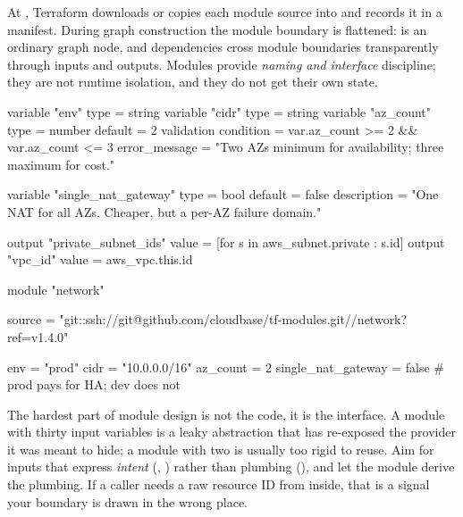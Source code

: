  At , Terraform downloads or copies each module source into  and records it in a manifest. During graph construction the module boundary is flattened:  is an ordinary graph node, and dependencies cross module boundaries transparently through inputs and outputs. Modules provide \emph{naming and interface} discipline; they are not runtime isolation, and they do not get their own state.

\begin{tfbox}
variable "env"      { type = string }
variable "cidr"     { type = string }
variable "az_count" {
  type    = number
  default = 2
  validation {
    condition     = var.az_count >= 2 && var.az_count <= 3
    error_message = "Two AZs minimum for availability; three maximum for cost."
  }
}

variable "single_nat_gateway" {
  type        = bool
  default     = false
  description = "One NAT for all AZs. Cheaper, but a per-AZ failure domain."
}

output "private_subnet_ids" { value = [for s in aws_subnet.private : s.id] }
output "vpc_id"             { value = aws_vpc.this.id }
\end{tfbox}

\begin{tfbox}
module "network" {
  source = "git::ssh://git@github.com/cloudbase/tf-modules.git//network?ref=v1.4.0"

  env                = "prod"
  cidr               = "10.0.0.0/16"
  az_count           = 2
  single_nat_gateway = false   # prod pays for HA; dev does not
}
\end{tfbox}

\begin{seniornote}
The hardest part of module design is not the code, it is the interface. A module with thirty input variables is a leaky abstraction that has re-exposed the provider it was meant to hide; a module with two is usually too rigid to reuse. Aim for inputs that express \emph{intent} (, ) rather than plumbing (), and let the module derive the plumbing. If a caller needs a raw resource ID from inside, that is a signal your boundary is drawn in the wrong place.
\end{seniornote}

